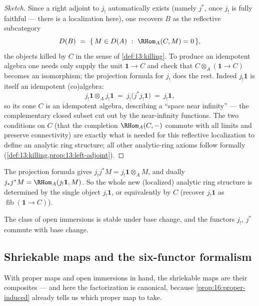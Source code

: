 \begin{proof}[Sketch]
Since a right adjoint to $j_!$ automatically exists (namely $j^*$, once $j_!$ is fully
faithful --- there is a localization here), one recovers $B$ as the reflective
subcategory
\begin{equation*}
D(B)\ =\ \{\,M\in D(A)\ :\ \RHom_A(C,M)=0\,\},
\end{equation*}
the objects killed by $C$ in the sense of \cref{def:13:killing}. To produce an
idempotent algebra one needs only supply the unit $\mathbf 1\to C$ and check that
$C\otimes_A(\mathbf 1\to C)$ becomes an isomorphism; the projection formula for $j_!$
does the rest. Indeed $j_!\mathbf 1$ is itself an idempotent (co)algebra:
\begin{equation*}
j_!\mathbf 1\otimes_A j_!\mathbf 1\ =\ j_!\bigl(j^* j_!\mathbf 1\bigr)\ =\ j_!\mathbf 1,
\end{equation*}
so its cone $C$ is an idempotent algebra, describing a ``space near infinity'' --- the
complementary closed subset cut out by the near-infinity functions. The two conditions
on $C$ (that the completion $\RHom_A(C,-)$ commute with all limits and preserve
connectivity) are exactly what is needed for this reflective localization to define an
analytic ring structure; all other analytic-ring axioms follow formally
(\cref{def:13:killing,prop:13:left-adjoint}).
\end{proof}

\begin{remark}
\label{rmk:16:jshriek-proj}
The projection formula gives $j_!j^*M=j_!\mathbf 1\otimes_A M$, and dually
$j_*j^*M=\RHom_A(j_!\mathbf 1,M)$. So the whole new (localized) analytic ring structure
is determined by the single object $j_!\mathbf 1$, or equivalently by $C$ (recover
$j_!\mathbf 1$ as $\operatorname{fib}(\mathbf 1\to C)$).
\end{remark}

\begin{corollary}
\label{cor:16:open-base-change}
The class of open immersions is stable under base change, and the functors $j_!$, $j^*$
commute with base change.
\end{corollary}

\subsection{Shriekable maps and the six-functor formalism}
\label{subsec:16:shriekable}

With proper maps and open immersions in hand, the shriekable maps are their
composites --- and here the factorization is canonical, because
\cref{prop:16:proper-induced} already tells us which proper map to take.


